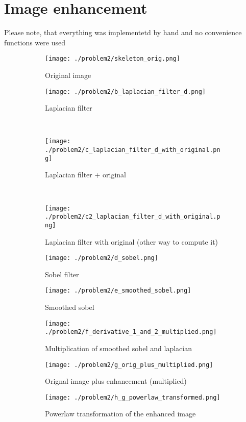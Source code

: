 \documentclass[a4paper]{scrartcl}
\begin{document}
\section{Image enhancement}

Please note, that everything was implementetd by hand and no convenience functions were used

\begin{figure}[h]
    \centering
    \begin{subfigure}[t]{0.3\textwidth}
        \texttt{[image: ./problem2/skeleton\_orig.png]}
        \caption{Original image}
    \end{subfigure}
    \begin{subfigure}[t]{0.3\textwidth}
        \texttt{[image: ./problem2/b\_laplacian\_filter\_d.png]}
        \caption{Laplacian filter}
    \end{subfigure}
    ~ %
    \begin{subfigure}[t]{0.3\textwidth}
        \texttt{[image: ./problem2/c\_laplacian\_filter\_d\_with\_original.png]}
        \caption{Laplacian filter + original}
    \end{subfigure}
    ~ %
    \begin{subfigure}[t]{0.3\textwidth}
        \texttt{[image: ./problem2/c2\_laplacian\_filter\_d\_with\_original.png]}
        \caption{Laplacian filter with original (other way to compute it)}
    \end{subfigure}
    \begin{subfigure}[t]{0.3\textwidth}
        \texttt{[image: ./problem2/d\_sobel.png]}
        \caption{Sobel filter}
    \end{subfigure}
    \begin{subfigure}[t]{0.3\textwidth}
        \texttt{[image: ./problem2/e\_smoothed\_sobel.png]}
        \caption{Smoothed sobel}
    \end{subfigure}
    \begin{subfigure}[t]{0.3\textwidth}
        \texttt{[image: ./problem2/f\_derivative\_1\_and\_2\_multiplied.png]}
        \caption{Multiplication of smoothed sobel and laplacian}
    \end{subfigure}
    \begin{subfigure}[t]{0.3\textwidth}
        \texttt{[image: ./problem2/g\_orig\_plus\_multiplied.png]}
        \caption{Orignal image plus enhancement (multiplied)}
    \end{subfigure}
    \begin{subfigure}[t]{0.3\textwidth}
        \texttt{[image: ./problem2/h\_g\_powerlaw\_transformed.png]}
        \caption{Powerlaw transformation of the enhanced image}
    \end{subfigure}

    \caption{}
\end{figure}
\end{document}
